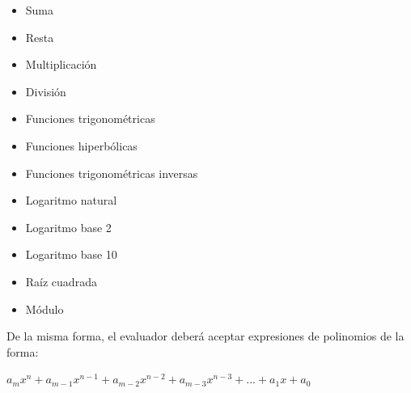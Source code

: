 \documentclass[10pt]{report}
\begin{document}
\begin{itemize}
\item Suma
\item Resta
\item Multiplicación
\item División
\item Funciones trigonométricas

\item Funciones hiperbólicas

\item Funciones trigonométricas inversas

\item Logaritmo natural
\item Logaritmo base 2 
\item Logaritmo base 10
\item Raíz cuadrada
\item Módulo
\end{itemize}

De la misma forma, el evaluador deberá aceptar expresiones de polinomios de la forma:

\begin{center}
$a_m x^n + a_{m-1} x^{n-1}+ a_{m-2} x^{n-2}+ a_{m-3} x^{n-3} + ... + a_1 x + a_0$
\end{center}
\end{document}
